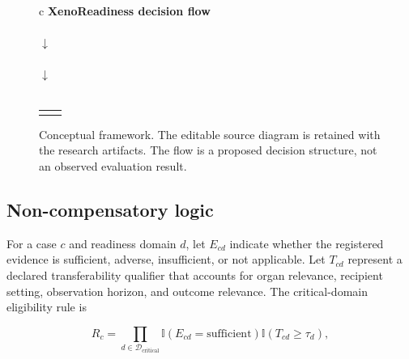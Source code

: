 \documentclass[conference]{IEEEtran}
\begin{document}
\begin{figure}[t]
\centering
\footnotesize
\begin{tabular}{c}
\textbf{XenoReadiness decision flow}\\[2pt]
\\[3pt]
$\downarrow$\\[-1pt]
\\[3pt]
$\downarrow$\\[-1pt]
\\[3pt]
\begin{tabular}{c@{\qquad}c}
\fbox{\parbox{0.36\columnwidth}{\centering Fail or unknown\\System deployment not established\\or evidence abstention}} &
\fbox{\parbox{0.36\columnwidth}{\centering Pass with sensitivity analysis\\bounded readiness conclusion\\not automatic routine deployment}}
\end{tabular}
\end{tabular}
\caption{Conceptual framework. The editable source diagram is retained with the research artifacts. The flow is a proposed decision structure, not an observed evaluation result.}
\label{fig:readiness-flow}
\end{figure}

\subsection{Non-compensatory logic}

For a case $c$ and readiness domain $d$, let $E_{cd}$ indicate whether the registered evidence is sufficient, adverse, insufficient, or not applicable. Let $T_{cd}$ represent a declared transferability qualifier that accounts for organ relevance, recipient setting, observation horizon, and outcome relevance. The critical-domain eligibility rule is

\begin{equation}
R_c=\prod_{d\in\mathcal{D}_{\mathrm{critical}}}\mathbb{I}\left(E_{cd}=\mathrm{sufficient}\right)\mathbb{I}\left(T_{cd}\geq\tau_d\right),
\label{eq:gate}
\end{equation}
\end{document}
